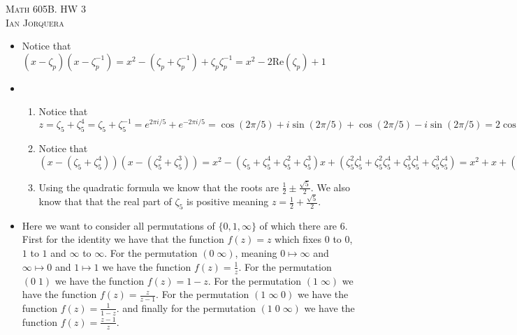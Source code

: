 \documentclass[12pt]{amsart}
\theoremstyle{definition}
\begin{document}
\begin{center}
    \textsc{Math 605B. HW 3\\ Ian Jorquera}
\end{center}
\vspace{1em}

\begin{itemize}
\item[(2)] Notice that $(x-\zeta_p)(x-\zeta_p^{-1})=x^2-(\zeta_p+\zeta_p^{-1})+\zeta_p\zeta_p^{-1}=x^2-2\text{Re}(\zeta_p)+1$\\

\item[(3)]
\begin{enumerate}[label=(\alph*)]
    \item Notice that $z=\zeta_5+\zeta^4_5=\zeta_5+\zeta^{-1}_5=e^{2\pi i/5}+e^{-2\pi i/5}=\cos(2\pi /5)+i\sin(2\pi /5)+\cos(2\pi /5)-i\sin(2\pi /5)=2\cos(2\pi /5)$

    \item Notice that $(x-(\zeta_5+\zeta_5^4))(x-(\zeta_5^2+\zeta_5^3))=x^2-(\zeta_5+\zeta_5^4+\zeta_5^2+\zeta_5^3)x+(\zeta_5^2\zeta_5^1+\zeta_5^2\zeta_5^4+\zeta_5^3\zeta_5^1+\zeta_5^3\zeta_5^4)=x^2+x+(\zeta_5^3+\zeta_5^1+\zeta_5^4+\zeta_5^2)=x^2+x-1$
    \item Using the quadratic formula we know that the roots are $\frac{1}{2}\pm \frac{\sqrt{5}}{2}$. We also know that that the real part of $\zeta_5$ is positive meaning $z=\frac{1}{2}+ \frac{\sqrt{5}}{2}$.\\
\end{enumerate}

\item[(4)] Here we want to consider all permutations of $\{0,1,\infty\}$ of which there are 6. First for the identity we have that the function $f(z)=z$ which fixes $0$ to $0$, $1$ to $1$ and $\infty$ to $\infty$. For the permutation $(0\;\infty)$, meaning $0\mapsto \infty$ and $\infty\mapsto 0$ and $1\mapsto 1$ we have the function $f(z)=\frac{1}{z}$. For the permutation $(0\; 1)$ we have the function $f(z)=1-z$. For the permutation $(1\;\infty)$ we have the function $f(z)=\frac{z}{z-1}$. For the permutation $(1\;\infty\;0)$ we have the function $f(z)=\frac{1}{1-z}$. and finally for the permutation $(1\;0\;\infty)$ we have the function $f(z)=\frac{z-1}{z}$.\\


\end{itemize}
\end{document}
